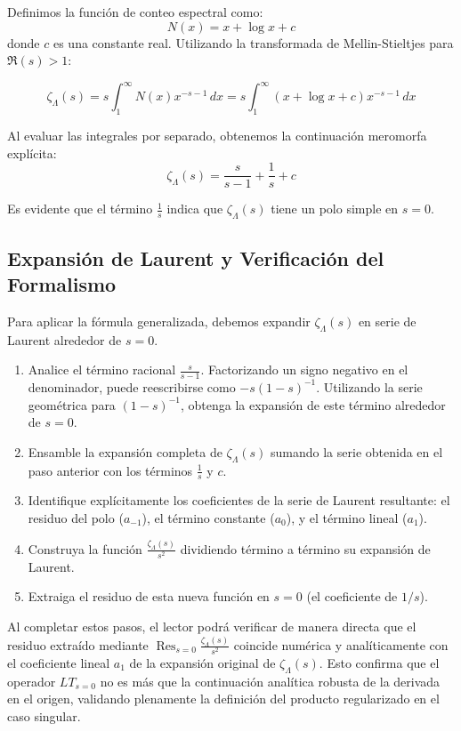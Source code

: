 \documentclass{article}
\begin{document}
Definimos la función de conteo espectral como:
\[
N(x) = x + \log x + c
\]
donde $c$ es una constante real. Utilizando la transformada de Mellin-Stieltjes para $\Re(s) > 1$:

\[
\zeta_\Lambda(s) = s \int_1^{\infty} N(x) x^{-s-1} \, dx = s \int_1^{\infty} (x + \log x + c) x^{-s-1} \, dx
\]

Al evaluar las integrales por separado, obtenemos la continuación meromorfa explícita:
\[
\zeta_\Lambda(s) = \frac{s}{s-1} + \frac{1}{s} + c
\]

Es evidente que el término $\frac{1}{s}$ indica que $\zeta_\Lambda(s)$ tiene un polo simple en $s=0$.

\subsection{Expansión de Laurent y Verificación del Formalismo}

Para aplicar la fórmula generalizada, debemos expandir $\zeta_\Lambda(s)$ en serie de Laurent alrededor de $s=0$. 

\begin{enumerate}
    \item Analice el término racional $\frac{s}{s-1}$. Factorizando un signo negativo en el denominador, puede reescribirse como $-s{(1-s)}^{-1}$. Utilizando la serie geométrica para ${(1-s)}^{-1}$, obtenga la expansión de este término alrededor de $s=0$.
    \item Ensamble la expansión completa de $\zeta_\Lambda(s)$ sumando la serie obtenida en el paso anterior con los términos $\frac{1}{s}$ y $c$.
    \item Identifique explícitamente los coeficientes de la serie de Laurent resultante: el residuo del polo ($a_{-1}$), el término constante ($a_0$), y el término lineal ($a_1$).
    \item Construya la función $\frac{\zeta_\Lambda(s)}{s^2}$ dividiendo término a término su expansión de Laurent.
    \item Extraiga el residuo de esta nueva función en $s=0$ (el coeficiente de $1/s$). 
\end{enumerate}

Al completar estos pasos, el lector podrá verificar de manera directa que el residuo extraído mediante $\operatorname{Res}_{s=0} \frac{\zeta_\Lambda(s)}{s^2}$ coincide numérica y analíticamente con el coeficiente lineal $a_1$ de la expansión original de $\zeta_\Lambda(s)$. Esto confirma que el operador $LT_{s=0}$ no es más que la continuación analítica robusta de la derivada en el origen, validando plenamente la definición del producto regularizado en el caso singular.
\end{document}
